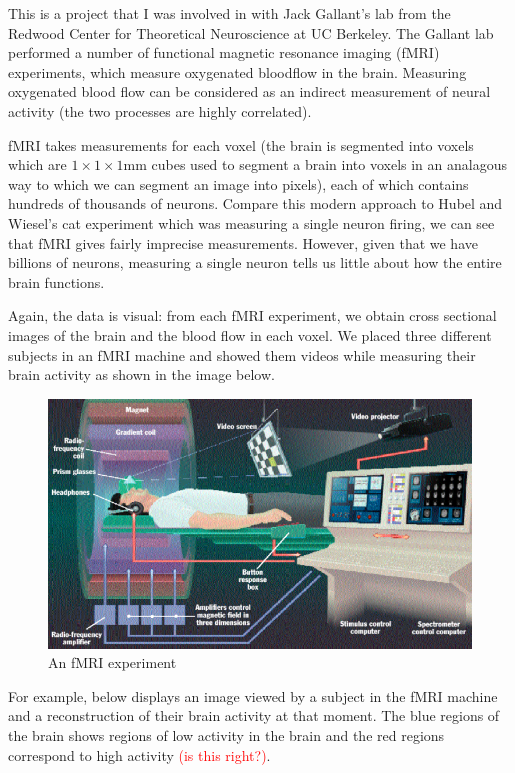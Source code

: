 This is a project that I was involved in with Jack Gallant's lab from the Redwood Center for Theoretical Neuroscience at UC Berkeley. The Gallant lab performed a number of functional magnetic resonance imaging (fMRI) experiments, which measure oxygenated bloodflow in the brain. Measuring oxygenated blood flow can be considered as an indirect measurement of neural activity (the two processes are highly correlated). 

fMRI takes measurements for each voxel (the brain is segmented into voxels which are $1 \times 1 \times 1$mm cubes used to segment a brain into voxels in an analagous way to which we can segment an image into pixels), each of which contains hundreds of thousands of neurons. Compare this modern approach to Hubel and Wiesel's cat experiment which was measuring a single neuron firing, we can see that fMRI gives fairly imprecise measurements. However, given that we have billions of neurons, measuring a single neuron tells us little about how the entire brain functions.

Again, the data is visual: from each fMRI experiment, we obtain cross sectional images of the brain and the blood flow in each voxel. We placed three different subjects in an fMRI machine and showed them videos while measuring their brain activity as shown in the image below.

\begin{figure}[H]
\begin{center}
\includegraphics[scale=0.3]{fmri.png}
\end{center}
\caption{An fMRI experiment}
\label{fig:fmri}
\end{figure}

For example, below displays an image viewed by a subject in the fMRI machine and a reconstruction of their brain activity at that moment. The blue regions of the brain shows regions of low activity in the brain and the red regions correspond to high activity \textcolor{red}{(is this right?)}.

